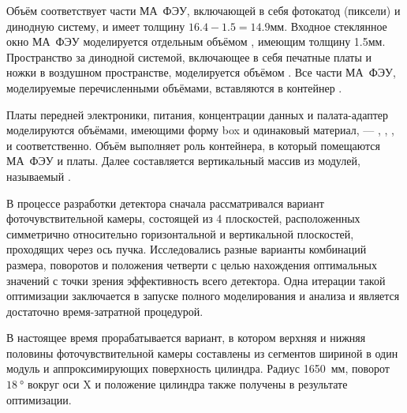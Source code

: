 Объём  соответствует части МА~ФЭУ, включающей в себя фотокатод (пиксели) и динодную систему, и имеет толщину $16.4-1.5=14.9$мм. Входное стеклянное окно МА~ФЭУ моделируется отдельным объёмом , имеющим толщину 1.5мм. Пространство за динодной системой, включающее в себя печатные платы и ножки в воздушном пространстве, моделируется объёмом . Все части МА~ФЭУ, моделируемые перечисленными объёмами, вставляются в контейнер .

Платы передней электроники, питания, концентрации данных и палата-адаптер моделируются объёмами, имеющими форму box и одинаковый материал, --- , , , и  соответственно. Объём  выполняет роль контейнера, в который помещаются МА~ФЭУ и платы. Далее составляется вертикальный массив из  модулей, называемый .

В процессе разработки детектора сначала рассматривался вариант фоточувствительной камеры, состоящей из 4 плоскостей, расположенных симметрично относительно горизонтальной и вертикальной плоскостей, проходящих через ось пучка. Исследовались разные варианты комбинаций размера, поворотов и положения четверти с целью нахождения оптимальных значений с точки зрения эффективность всего детектора. Одна итерации такой оптимизации заключается в запуске полного моделирования и анализа и является достаточно время-затратной процедурой.

В настоящее время прорабатывается вариант, в котором верхняя и нижняя половины фоточувствительной камеры составлены из сегментов шириной в один модуль и аппроксимирующих поверхность цилиндра. Радиус 1650~мм, поворот $\SI{18}{\degree}$ вокруг оси X и положение цилиндра также получены в результате оптимизации.

